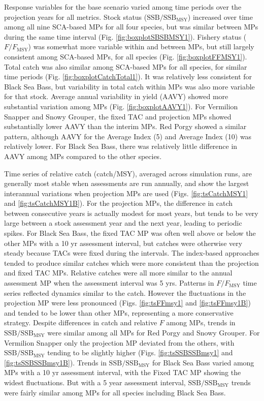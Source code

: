 \documentclass[12pt,english]{article}
\begin{document}
\begin{flushleft}
\begin{spacing}{1.9}
Response variables for the base scenario varied among time periods over the projection years for all metrics. Stock status ($\mathrm{SSB/SSB_{MSY}}$) increased over time among all nine SCA-based MPs for all four species, but was similar between MPs during the same time interval (Fig. \ref{fig:boxplotSBSBMSY1}). Fishery status ($F/F_{\mathrm{MSY}}$) was somewhat more  variable within and between MPs, but still largely consistent among SCA-based MPs, for all species (Fig. \ref{fig:boxplotFFMSY1}). Total catch was also similar among SCA-based MPs for all species, for similar time periods (Fig. \ref{fig:boxplotCatchTotal1}). It was relatively less consistent for Black Sea Bass, but variability in total catch within MPs was also more variable for that stock. Average annual variability in yield (AAVY) showed more substantial variation among MPs (Fig. \ref{fig:boxplotAAVY1}). For Vermilion Snapper and Snowy Grouper, the fixed TAC and projection MPs showed substantially lower AAVY than the interim MPs. Red Porgy showed a similar pattern, although AAVY for the Average Index (5) and Average Index (10) was relatively lower. For Black Sea Bass, there was relatively little difference in AAVY among MPs compared to the other species.

Time series of relative catch (catch/MSY), averaged across simulation runs, are generally most stable when assessments are run annually, and show the largest interannual variations when projection MPs are used (Figs. \ref{fig:tsCatchMSY1} and \ref{fig:tsCatchMSY1B}). For the projection MPs, the difference in catch between consecutive years is actually modest for most years, but tends to be very large between a stock assessment year and the next year, leading to periodic spikes. For Black Sea Bass, the fixed TAC MP was often well above or below the other MPs with a 10 yr assessment interval, but catches were otherwise very steady because TACs were fixed during the intervals. The index-based approaches tended to produce similar catches which were more consistent than the projection and fixed TAC MPs. Relative catches were all more similar to the annual assessment MP when the assessment interval was 5 yrs. Patterns in $F/F_{\mathrm{MSY}}$ time series reflected dynamics similar to the catch. However the fluctuations in the projection MP were less pronounced (Figs. \ref{fig:tsFFmsy1} and \ref{fig:tsFFmsy1B}) and tended to be lower than other MPs, representing a more conservative strategy. Despite differences in catch and relative $F$ among MPs, trends in $\mathrm{SSB/SSB_{MSY}}$ were similar among all MPs for Red Porgy and Snowy Grouper. For Vermilion Snapper only the projection MP deviated from the others, with $\mathrm{SSB/SSB_{MSY}}$ tending to be slightly higher (Figs. \ref{fig:tsSSBSSBmsy1} and \ref{fig:tsSSBSSBmsy1B}). Trends in $\mathrm{SSB/SSB_{MSY}}$ for Black Sea Bass varied among MPs with a 10 yr assessment interval, with the Fixed TAC MP showing the widest fluctuations. But with a 5 year assessment interval, $\mathrm{SSB/SSB_{MSY}}$ trends were fairly similar among MPs for all species including Black Sea Bass.


\end{spacing}
\end{flushleft}
\end{document}
